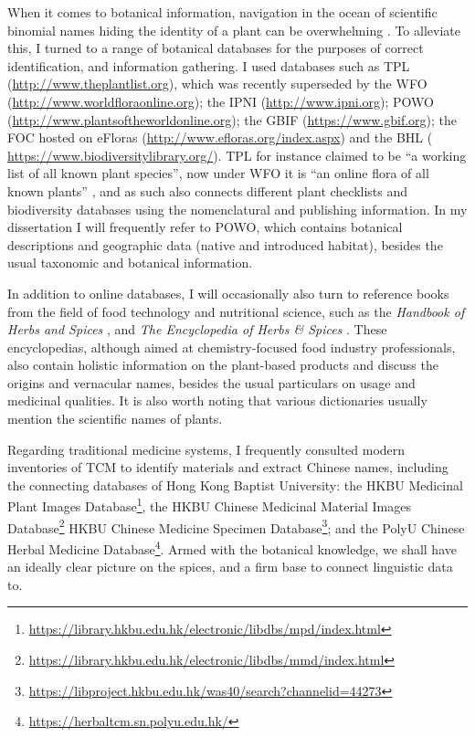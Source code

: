 When it comes to botanical information, navigation in the ocean of scientific binomial names hiding the identity of a plant can be overwhelming \autocite{spencer_plant_2020}. To alleviate this, I turned to a range of botanical databases for the purposes of correct identification, and information gathering. I used databases such as \gls{TPL} (\url{http://www.theplantlist.org}), which was recently superseded by the \gls{WFO} (\url{http://www.worldfloraonline.org}); the \gls{IPNI} (\url{http://www.ipni.org}); \gls{POWO} (\url{http://www.plantsoftheworldonline.org}); the \gls{GBIF} (\url{https://www.gbif.org}); the \gls{FOC} hosted on eFloras (\url{http://www.efloras.org/index.aspx}) and the \gls{BHL} (\url{ https://www.biodiversitylibrary.org/}). \gls{TPL} for instance claimed to be ``a working list of all known plant species'', now under \gls{WFO} it is ``an online flora of all known plants'' , and as such also connects different plant checklists and biodiversity databases using the nomenclatural and publishing information. In my dissertation I will frequently refer to \gls{POWO}, which contains botanical descriptions and geographic data (native and introduced habitat), besides the usual taxonomic and botanical information. 

In addition to online databases, I will occasionally also turn to reference books from the field of food technology and nutritional science, such as the \textit{Handbook of Herbs and Spices} \autocite{peter_handbook_2012,peter_handbook_2006}, and \textit{The Encyclopedia of Herbs \& Spices} \autocite{ravindran_encyclopedia_2017}. These encyclopedias, although aimed at chemistry-focused food industry professionals, also contain holistic information on the plant-based products and discuss the origins and vernacular names, besides the usual particulars on usage and medicinal qualities. It is also worth noting that various dictionaries usually mention the scientific names of plants.

Regarding traditional medicine systems, I frequently consulted modern inventories of \gls{TCM} to identify materials and extract Chinese names, including the connecting databases of Hong Kong Baptist University: the HKBU Medicinal Plant Images Database\footnote{\url{https://library.hkbu.edu.hk/electronic/libdbs/mpd/index.html}}, the HKBU Chinese Medicinal Material Images Database\footnote{\url{https://library.hkbu.edu.hk/electronic/libdbs/mmd/index.html}} HKBU Chinese Medicine Specimen Database\footnote{\url{https://libproject.hkbu.edu.hk/was40/search?channelid=44273}}; and the PolyU Chinese Herbal Medicine Database\footnote{\url{https://herbaltcm.sn.polyu.edu.hk/}}. Armed with the botanical knowledge, we shall have an ideally clear picture on the spices, and a firm base to connect linguistic data to.

